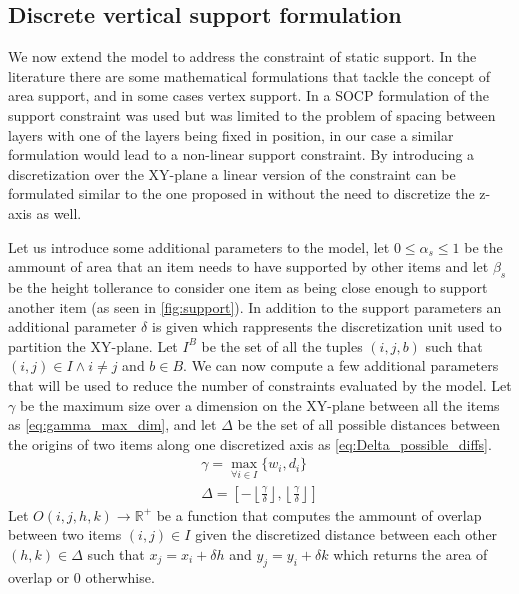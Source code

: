 \subsection{Discrete vertical support formulation}
\label{subsec:vertical_support_formulation}%

We now extend the model to address the constraint of static support. 
In the literature there are some mathematical formulations that tackle the concept of area support, and in some cases vertex support. In \citeauthor{elhedhli2019three} a SOCP formulation of the support constraint was used but was limited to the problem of spacing between layers with one of the layers being fixed in position, in our case a similar formulation would lead to a non-linear support constraint.
By introducing a discretization over the XY-plane a linear version of the constraint can be formulated similar to the one proposed in \citeauthor{kurpel2020exact} without the need to discretize the z-axis as well.

Let us introduce some additional parameters to the model, let $0 \le \alpha_s \le 1$ be the ammount of area that an item needs to have supported by other items and let $\beta_s$ be the height tollerance to consider one item as being close enough to support another item (as seen in \cref{fig:support}).
In addition to the support parameters an additional parameter $\delta$ is given which rappresents the discretization unit used to partition the XY-plane. Let $I^B$ be the set of all the tuples $(i, j, b)$ such that $(i,j) \in I \land i \neq j$ and $b \in B$.
We can now compute a few additional parameters that will be used to reduce the number of constraints evaluated by the model. Let $\gamma$ be the maximum size over a dimension on the XY-plane between all the items as \cref{eq:gamma_max_dim}, and let $\Delta$ be the set of all possible distances between the origins of two items along one discretized axis as \cref{eq:Delta_possible_diffs}.
\begin{align}
    \gamma = \max_{\forall i \in I}\{ w_i, d_i \} \label{eq:gamma_max_dim} \\
    \Delta =  \left[ - \left\lfloor \frac{ \gamma }{\delta} \right\rfloor, \left\lfloor \frac{ \gamma }{\delta} \right\rfloor \right] \label{eq:Delta_possible_diffs}
\end{align}
Let $O(i, j, h, k) \rightarrow \mathbb{R}^+$ be a function that computes the ammount of overlap between two items $(i,j) \in I$ given the discretized distance between each other $(h, k) \in \Delta$ such that $x_j = x_i + \delta h$ and $y_j = y_i + \delta k$ which returns the area of overlap or 0 otherwhise.

